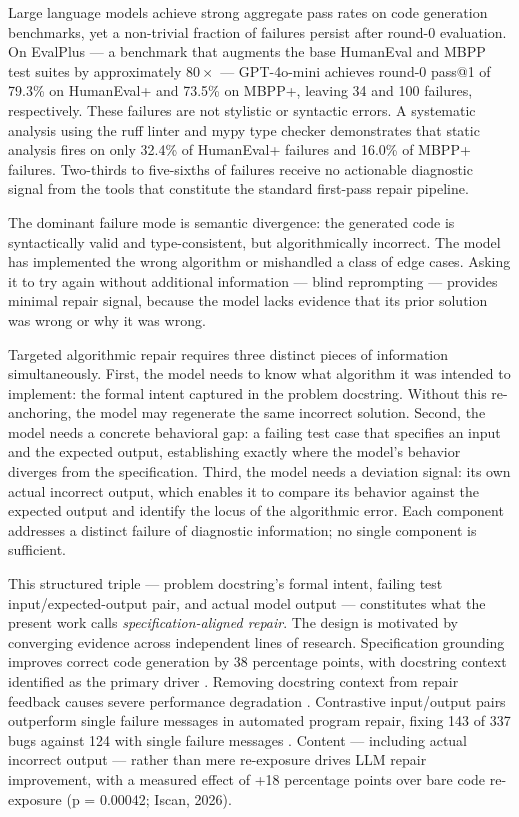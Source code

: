 
Large language models achieve strong aggregate pass rates on code generation benchmarks, yet a non-trivial fraction of failures persist after round-0 evaluation. On EvalPlus --- a benchmark that augments the base HumanEval and MBPP test suites by approximately $80\times$ --- GPT-4o-mini achieves round-0 pass@1 of 79.3\% on HumanEval+ and 73.5\% on MBPP+, leaving 34 and 100 failures, respectively. These failures are not stylistic or syntactic errors. A systematic analysis using the ruff linter and mypy type checker demonstrates that static analysis fires on only 32.4\% of HumanEval+ failures and 16.0\% of MBPP+ failures. Two-thirds to five-sixths of failures receive no actionable diagnostic signal from the tools that constitute the standard first-pass repair pipeline.

The dominant failure mode is semantic divergence: the generated code is syntactically valid and type-consistent, but algorithmically incorrect. The model has implemented the wrong algorithm or mishandled a class of edge cases. Asking it to try again without additional information --- blind reprompting --- provides minimal repair signal, because the model lacks evidence that its prior solution was wrong or why it was wrong.

Targeted algorithmic repair requires three distinct pieces of information simultaneously. First, the model needs to know what algorithm it was intended to implement: the formal intent captured in the problem docstring. Without this re-anchoring, the model may regenerate the same incorrect solution. Second, the model needs a concrete behavioral gap: a failing test case that specifies an input and the expected output, establishing exactly where the model's behavior diverges from the specification. Third, the model needs a deviation signal: its own actual incorrect output, which enables it to compare its behavior against the expected output and identify the locus of the algorithmic error. Each component addresses a distinct failure of diagnostic information; no single component is sufficient.

This structured triple --- problem docstring's formal intent, failing test input/expected-output pair, and actual model output --- constitutes what the present work calls \textit{specification-aligned repair}. The design is motivated by converging evidence across independent lines of research. Specification grounding improves correct code generation by 38 percentage points, with docstring context identified as the primary driver \citep{Haeri2026Specification}. Removing docstring context from repair feedback causes severe performance degradation \citep{Dai2025FeedbackEval}. Contrastive input/output pairs outperform single failure messages in automated program repair, fixing 143 of 337 bugs against 124 with single failure messages \citep{Kong2024ContrastRepair}. Content --- including actual incorrect output --- rather than mere re-exposure drives LLM repair improvement, with a measured effect of +18 percentage points over bare code re-exposure (p = 0.00042; Iscan, 2026).

